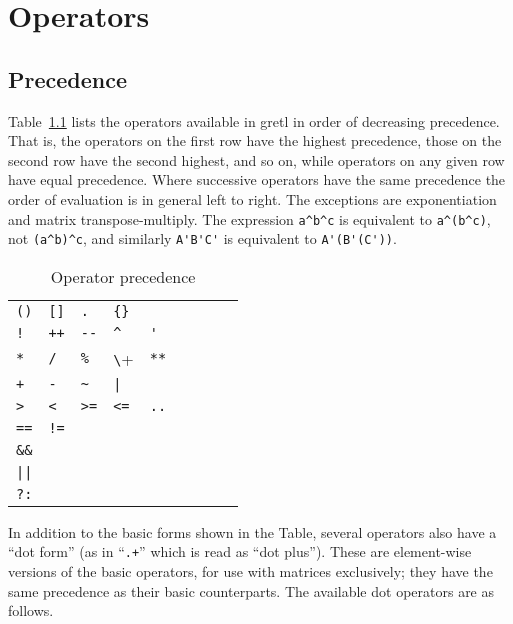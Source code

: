 \chapter{Operators}
\label{chap:operators}

\section{Precedence}

Table~\ref{tab:ops} lists the operators available in gretl in order of
decreasing precedence. That is, the operators on the first row have
the highest precedence, those on the second row have the second
highest, and so on, while operators on any given row have equal
precedence. Where successive operators have the same precedence the
order of evaluation is in general left to right. The exceptions are
exponentiation and matrix transpose-multiply. The expression
\verb|a^b^c| is equivalent to \verb|a^(b^c)|, not \verb|(a^b)^c|, and
similarly \verb|A'B'C'| is equivalent to \verb|A'(B'(C'))|.

\begin{table}[htbp]
\caption{Operator precedence}
\label{tab:ops}
\begin{center}
\begin{tabular}{lllllllll}
\verb|()| & \verb|[]| & \texttt{.} & \verb|{}| \\
\texttt{!} & \texttt{++} & \verb|--| & \verb|^| & \verb|'| \\
\texttt{*} & \texttt{/} & \texttt{\%} & \verb+\+ & \texttt{**} \\
\texttt{+} & \texttt{-} & \verb|~| & \verb+|+ & \\
\verb|>| & \verb|<| & \verb|>=| & \verb|<=| & \texttt{..} \\
\texttt{==} & \texttt{!=} \\
\verb|&&| \\
\verb+||+ \\
\texttt{?:} \\
\end{tabular}
\end{center}
\end{table}

In addition to the basic forms shown in the Table, several operators
also have a ``dot form'' (as in ``\texttt{.+}'' which is read as ``dot
plus''). These are element-wise versions of the basic operators, for
use with matrices exclusively; they have the same precedence as their
basic counterparts. The available dot operators are as follows.

